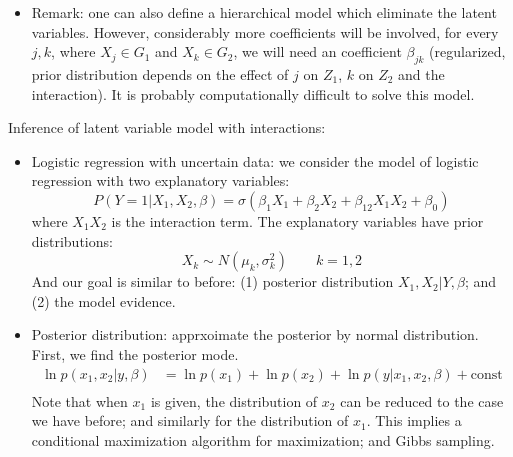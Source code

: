 \documentclass[11pt]{article}
\begin{document}
\begin{enumerate}
\begin{itemize}
\item Remark: one can also define a hierarchical model which eliminate the latent variables. However, considerably more coefficients will be involved, for every $j,k$, where $X_j \in G_1$ and $X_k \in G_2$, we will need an coefficient $\beta_{jk}$ (regularized, prior distribution depends on the effect of $j$ on $Z_1$, $k$ on $Z_2$ and the interaction). It is probably computationally difficult to solve this model. 
\end{itemize}

Inference of latent variable model with interactions: 
\begin{itemize}
\item Logistic regression with uncertain data: we consider the model of logistic regression with two explanatory variables: 
\begin{equation}
P(Y=1|X_1,X_2,\beta) = \sigma(\beta_1 X_1 + \beta_2 X_2 + \beta_{12} X_1 X_2 + \beta_0)	
\end{equation}
where $X_1 X_2$ is the interaction term. The explanatory variables have prior distributions: 
\begin{equation}
X_k \sim N(\mu_k,\sigma_k^2) \qquad k = 1,2	
\end{equation}
And our goal is similar to before: (1) posterior distribution $X_1,X_2|Y,\beta$; and (2) the model evidence. 

\item Posterior distribution: apprxoimate the posterior by normal distribution. First, we find the posterior mode. 
\begin{equation}
\begin{array}{ll}
\ln p(x_1, x_2|y,\beta) & = \ln p(x_1) + \ln p(x_2) + \ln p(y|x_1,x_2,\beta) + \text{const} \\
\end{array}
\end{equation}
Note that when $x_1$ is given, the distribution of $x_2$ can be reduced to the case we have before; and similarly for the distribution of $x_1$. This implies a conditional maximization algorithm for maximization; and Gibbs sampling. 


\end{itemize}
\end{enumerate}
\end{document}
